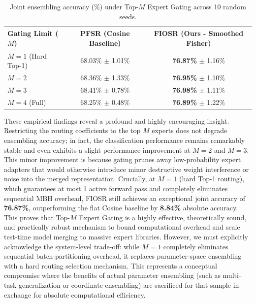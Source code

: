 \begin{enumerate}
\begin{itemize}
        \begin{table}[tb]
        \caption{Joint ensembling accuracy (\%) under Top-$M$ Expert Gating across 10 random seeds.}
        \label{tab:gating_ablation_results}
        \begin{center}
        \begin{small}
        \begin{sc}
        \begin{tabular}{lcc}
        \toprule
        Gating Limit ($M$) & PFSR (Cosine Baseline) & \textbf{FIOSR (Ours - Smoothed Fisher)} \\
        \midrule
        $M = 1$ (Hard Top-1) & 68.03\% $\pm$ 1.01\% & \textbf{76.87\%} $\pm$ 1.16\% \\
        $M = 2$ & 68.36\% $\pm$ 1.33\% & \textbf{76.95\%} $\pm$ 1.10\% \\
        $M = 3$ & 68.41\% $\pm$ 0.78\% & \textbf{76.98\%} $\pm$ 1.11\% \\
        $M = 4$ (Full) & 68.25\% $\pm$ 0.48\% & \textbf{76.89\%} $\pm$ 1.22\% \\
        \bottomrule
        \end{tabular}
        \end{sc}
        \end{small}
        \end{center}
        \end{table}

        These empirical findings reveal a profound and highly encouraging insight. Restricting the routing coefficients to the top $M$ experts does not degrade ensembling accuracy; in fact, the classification performance remains remarkably stable and even exhibits a slight performance improvement at $M=2$ and $M=3$. This minor improvement is because gating prunes away low-probability expert adapters that would otherwise introduce minor destructive weight interference or noise into the merged representation. Crucially, at $M=1$ (hard Top-1 routing), which guarantees at most 1 active forward pass and completely eliminates sequential MBH overhead, FIOSR still achieves an exceptional joint accuracy of \textbf{76.87\%}, outperforming the flat Cosine baseline by \textbf{8.84\%} absolute accuracy. This proves that Top-$M$ Expert Gating is a highly effective, theoretically sound, and practically robust mechanism to bound computational overhead and scale test-time model merging to massive expert libraries. However, we must explicitly acknowledge the system-level trade-off: while $M=1$ completely eliminates sequential batch-partitioning overhead, it replaces parameter-space ensembling with a hard routing selection mechanism. This represents a conceptual compromise where the benefits of actual parameter ensembling (such as multi-task generalization or coordinate ensembling) are sacrificed for that sample in exchange for absolute computational efficiency.
        

\end{itemize}
\end{enumerate}
